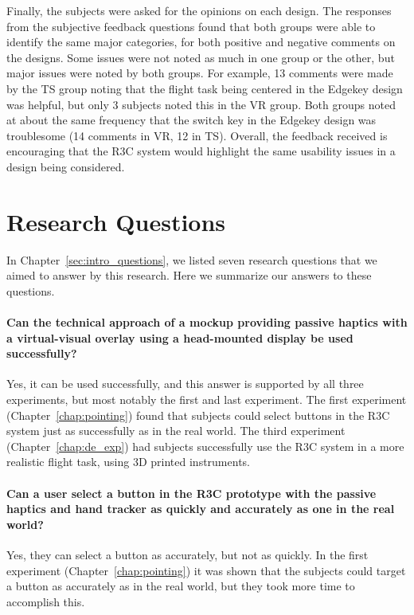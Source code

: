 Finally, the subjects were asked for the opinions on each design.
The responses from the subjective feedback questions found that both groups were able to identify the same major categories, for both positive and negative comments on the designs.
Some issues were not noted as much in one group or the other, but major issues were noted by both groups.
For example, 13 comments were made by the TS group noting that the flight task being centered in the Edgekey design was helpful, but only 3 subjects noted this in the VR group.
Both groups noted at about the same frequency that the switch key in the Edgekey design was troublesome (14 comments in VR, 12 in TS).
Overall, the feedback received is encouraging that the R3C system would highlight the same usability issues in a design being considered.

\section{Research Questions}

In Chapter~\ref{sec:intro_questions}, we listed seven research questions that we aimed to answer by this research.
Here we summarize our answers to these questions.

\paragraph{Can the technical approach of a mockup providing passive haptics with a virtual-visual overlay using a head-mounted display be used successfully?}
Yes, it can be used successfully, and this answer is supported by all three experiments, but most notably the first and last experiment.
The first experiment (Chapter~\ref{chap:pointing}) found that subjects could select buttons in the R3C system just as successfully as in the real world.
The third experiment (Chapter~\ref{chap:de_exp}) had subjects successfully use the R3C system in a more realistic flight task, using 3D printed instruments.

\paragraph{Can a user select a button in the R3C prototype with the passive haptics and hand tracker as quickly and accurately as one in the real world?}
Yes, they can select a button as accurately, but not as quickly.
In the first experiment (Chapter~\ref{chap:pointing}) it was shown that the subjects could target a button as accurately as in the real world, but they took more time to accomplish this.

